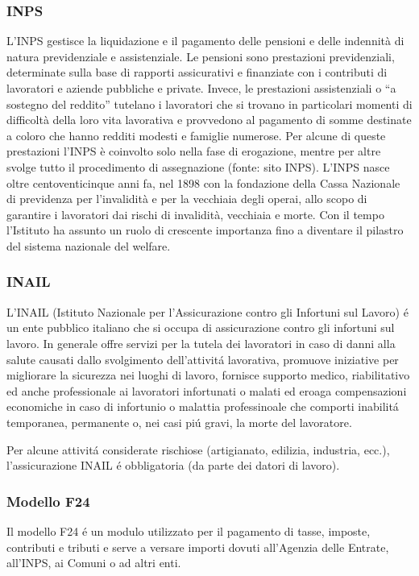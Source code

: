 \documentclass{article}
\begin{document}
\subsubsection{INPS}
L’INPS gestisce la liquidazione e il pagamento delle pensioni e delle indennità di natura previdenziale e assistenziale. Le pensioni sono prestazioni previdenziali, determinate sulla base di rapporti assicurativi e finanziate con i contributi di lavoratori e aziende pubbliche e private. Invece, le prestazioni assistenziali o “a sostegno del reddito” tutelano i lavoratori che si trovano in particolari momenti di difficoltà della loro vita lavorativa e provvedono al pagamento di somme destinate a coloro che hanno redditi modesti e famiglie numerose. Per alcune di queste prestazioni l’INPS è coinvolto solo nella fase di erogazione, mentre per altre svolge tutto il procedimento di assegnazione (fonte: sito INPS). L’INPS nasce oltre centoventicinque anni fa, nel 1898 con la fondazione della Cassa Nazionale di previdenza per l'invalidità e per la vecchiaia degli operai, allo scopo di garantire i lavoratori dai rischi di invalidità, vecchiaia e morte. Con il tempo l’Istituto ha assunto un ruolo di crescente importanza fino a diventare il pilastro del sistema nazionale del welfare.

\subsubsection{INAIL}
L'INAIL (Istituto Nazionale per l'Assicurazione contro gli Infortuni sul Lavoro) \'e un ente pubblico italiano che si occupa di assicurazione contro gli infortuni sul lavoro.
In generale offre servizi per la tutela dei lavoratori in caso di danni alla salute causati dallo svolgimento dell'attivit\'a lavorativa, promuove iniziative per migliorare la sicurezza nei luoghi di lavoro, 
fornisce supporto medico, riabilitativo ed anche professionale ai lavoratori infortunati o malati ed eroaga compensazioni economiche in caso di infortunio o malattia professinoale che comporti inabilit\'a temporanea, permanente o, nei casi pi\'u gravi, la morte del lavoratore.

Per alcune attivit\'a considerate rischiose (artigianato, edilizia, industria, ecc.), l'assicurazione INAIL \'e obbligatoria (da parte dei datori di lavoro).

\subsubsection{Modello F24}
Il modello F24 \'e un modulo utilizzato per il pagamento di tasse, imposte, contributi e tributi e serve a versare importi dovuti all'Agenzia delle Entrate, all'INPS, ai Comuni o ad altri enti. 
\end{document}
